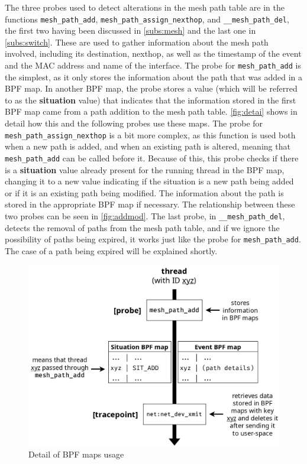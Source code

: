 The three probes used to detect alterations in the mesh path table are in the
functions \texttt{mesh\_path\_add}, \texttt{mesh\_path\_assign\_nexthop}, and
\texttt{\_\_mesh\_path\_del}, the first two having been discussed in
\autoref{subs:mesh} and the last one in \autoref{subs:switch}. These are used to
gather information about the mesh path involved, including its destination,
nexthop, as well as the timestamp of the event and the MAC address and name of
the interface. The probe for \texttt{mesh\_path\_add} is the simplest, as it
only stores the information about the path that was added in a BPF map. In
another BPF map, the probe stores a value (which will be referred to as the
\textbf{situation} value) that indicates that the information stored in the
first BPF map came from a path addition to the mesh path table.
\autoref{fig:detai} shows in detail how this and the following probes use these
maps. The probe for \texttt{mesh\_path\_assign\_nexthop} is a bit more complex,
as this function is used both when a new path is added, and when an existing
path is altered, meaning that \texttt{mesh\_path\_add} can be called before it.
Because of this, this probe checks if there is a \textbf{situation} value
already present for the running thread in the BPF map, changing it to a new
value indicating if the situation is a new path being added or if it is an
existing path being modified. The information about the path is stored in the
appropriate BPF map if necessary. The relationship between these two probes can
be seen in \autoref{fig:addmod}. The last probe, in
\texttt{\_\_mesh\_path\_del}, detects the removal of paths from the mesh path
table, and if we ignore the possibility of paths being expired, it works just
like the probe for \texttt{mesh\_path\_add}. The case of a path being expired
will be explained shortly.

\begin{figure}[htb]
   \centering
   \includegraphics[scale=.375]{detail}
   \caption{Detail of BPF maps usage}\label{fig:detai}
\end{figure}

